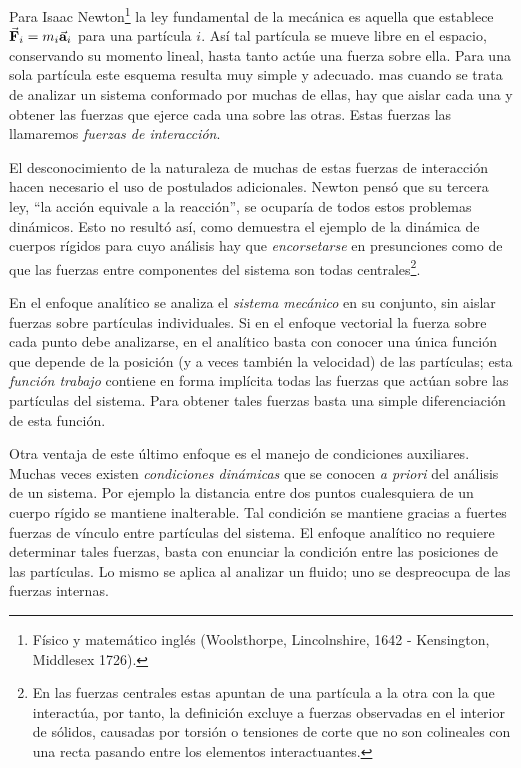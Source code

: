 \documentclass[12pt, spanish, a4paper, ]{article}
\begin{document}
Para Isaac Newton\footnote{Físico y matemático inglés (Woolsthorpe, Lincolnshire, 1642 - Kensington, Middlesex 1726).} la ley fundamental de la mecánica es aquella que establece \(\va{F}_i= m_i \va{a}_i\) para una partícula \(i\).
Así tal partícula se mueve libre en el espacio, conservando su momento lineal, hasta tanto actúe una fuerza sobre ella.
Para una sola partícula este esquema resulta muy simple y adecuado.
mas cuando se trata de analizar un sistema conformado por muchas de ellas, hay que aislar cada una y obtener las fuerzas que ejerce cada una sobre las otras.
Estas fuerzas las llamaremos \emph{fuerzas de interacción}.

El desconocimiento de la naturaleza de muchas de estas fuerzas de interacción hacen necesario el uso de postulados adicionales.
Newton pensó que su tercera ley, ``la acción equivale a la reacción'', se ocuparía de todos estos problemas dinámicos.
Esto no resultó así, como demuestra el ejemplo de la dinámica de cuerpos rígidos para cuyo análisis hay que \emph{encorsetarse} en presunciones como de que las fuerzas entre componentes del sistema son todas centrales\footnote{En las fuerzas centrales estas apuntan de una partícula a la otra con la que interactúa, por tanto, la definición excluye a fuerzas observadas en el interior de sólidos, causadas por torsión o tensiones de corte que no son colineales con una recta pasando entre los elementos interactuantes.}.

En el enfoque analítico se analiza el \emph{sistema mecánico} en su conjunto, sin aislar fuerzas sobre partículas individuales.
Si en el enfoque vectorial la fuerza sobre cada punto debe analizarse, en el analítico basta con conocer una única función que depende de la posición (y a veces también la velocidad) de las partículas; esta \emph{función trabajo} contiene en forma implícita todas las fuerzas que actúan sobre las partículas del sistema.
Para obtener tales fuerzas basta una simple diferenciación de esta función.

Otra ventaja de este último enfoque es el manejo de condiciones auxiliares.
Muchas veces existen \emph{condiciones dinámicas} que se conocen \emph{a priori} del análisis de un sistema.
Por ejemplo la distancia entre dos puntos cualesquiera de un cuerpo rígido se mantiene inalterable.
Tal condición se mantiene gracias a fuertes fuerzas de vínculo entre partículas del sistema.
El enfoque analítico no requiere determinar tales fuerzas, basta con enunciar la condición entre las posiciones de las partículas.
Lo mismo se aplica al analizar un fluido; uno se despreocupa de las fuerzas internas.
\end{document}
